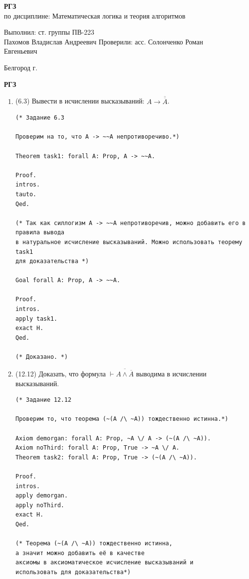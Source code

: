 \documentclass[a4paper,14pt]{extarticle}
\newcommand\textbox[1]{
	\parbox{.45\textwidth}{#1}
}
\begin{document}
\vfill
\begin{center}
	\large{
		\textbf{
			РГЗ}}\\
	\normalsize{
		по дисциплине: Математическая логика и теория алгоритмов}
\end{center}
\vfill
\hfill\textbox{
	Выполнил: ст. группы ПВ-223\\Пахомов Владислав Андреевич
	\bigbreak
	Проверили: асс. Солонченко Роман\\Евгеньевич
}
\vfill\begin{center}
	Белгород \the\year г.
\end{center}
\newpage
\begin{center}
	\textbf{РГЗ}
\end{center}
\begin{enumerate}
    \item (6.3) Вывести в исчислении высказываний: $A \rightarrow \overline{\overline{A}}$. 
\begin{verbatim}
(* Задание 6.3

Проверим на то, что A -> ~~A непротиворечиво.*)

Theorem task1: forall A: Prop, A -> ~~A.

Proof.
intros.
tauto.
Qed.

(* Так как силлогизм A -> ~~A непротиворечив, можно добавить его в правила вывода
в натуральное исчисление высказываний. Можно использовать теорему task1 
для доказательства *)

Goal forall A: Prop, A -> ~~A.

Proof.
intros.
apply task1.
exact H.
Qed.

(* Доказано. *)
\end{verbatim}
\item (12.12) Доказать, что формула $\vdash \overline{A \wedge \overline{A}}$ выводима в исчислении высказываний.
\begin{verbatim}
(* Задание 12.12

Проверим то, что теорема (~(A /\ ~A)) тождественно истинна.*)

Axiom demorgan: forall A: Prop, ~A \/ A -> (~(A /\ ~A)).
Axiom noThird: forall A: Prop, True -> ~A \/ A.
Theorem task2: forall A: Prop, True -> (~(A /\ ~A)).

Proof.
intros.
apply demorgan.
apply noThird.
exact H.
Qed.

(* Теорема (~(A /\ ~A)) тождественно истинна, 
а значит можно добавить её в качестве
аксиомы в аксиоматическое исчисление высказываний и 
использовать для доказательства*)


\end{verbatim}
\end{enumerate}
\end{document}
